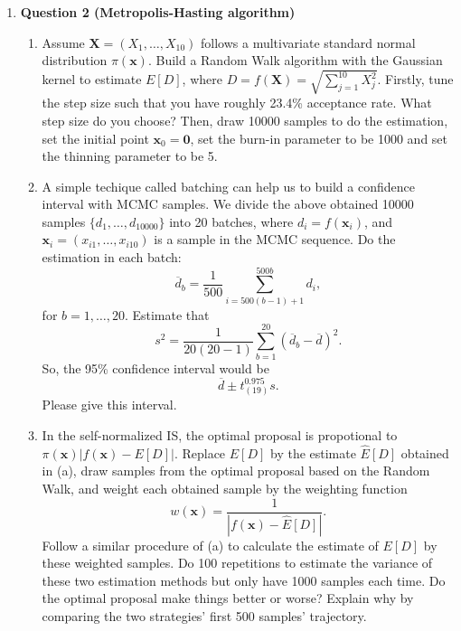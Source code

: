 \documentclass[notitlepage,a4paper,12pt]{article}%
\begin{document}
\begin{enumerate}

\item 
{\bf Question 2 (Metropolis-Hasting algorithm)}

\begin{enumerate} 
\item Assume $\mathbf{X}=(X_1,\dots,X_{10})$ follows a multivariate standard normal distribution $\pi(\mathbf{x})$. Build a Random Walk algorithm with the Gaussian kernel to estimate $E[D]$, where $D=f(\mathbf{X})=\sqrt{\sum_{j=1}^{10}X_j^2}$. Firstly, tune the step size such that you have roughly 23.4\% acceptance rate. What step size do you choose? Then, draw 10000 samples to do the estimation, set the initial point $\mathbf{x}_0=\mathbf{0}$, set the burn-in parameter to be 1000 and set the thinning parameter to be 5. 

\item A simple techique called batching can help us to build a confidence interval with MCMC samples. We divide the above obtained 10000 samples $\{d_1,\dots,d_{10000}\}$ into 20 batches, where $d_i=f(\mathbf{x}_i)$, and $\textbf{x}_i=(x_{i1},\dots,x_{i10})$ is a sample in the MCMC sequence. Do the estimation in each batch:
$$
\overline{d}_b=\frac{1}{500}\sum_{i=500(b-1)+1}^{500b}d_i,
$$
for $b=1,\dots,20$. Estimate that
$$
s^2=\frac{1}{20(20-1)}\sum_{b=1}^{20}(\overline{d}_b-\overline{d})^2. 
$$
So, the 95\% confidence interval would be
$$
\overline{d}\pm t_{(19)}^{0.975}s. 
$$
Please give this interval. 

\item In the self-normalized IS, the optimal proposal is propotional to $\pi(\mathbf{x})|f(\mathbf{x})-E[D]|$. Replace $E[D]$ by the estimate $\hat{E}[D]$ obtained in (a), draw samples from the optimal proposal based on the Random Walk, and weight each obtained sample by the weighting function 
$$
w(\mathbf{x})=\frac{1}{|f(\mathbf{x})-\hat{E}[D]|}. 
$$
Follow a similar procedure of (a) to calculate the estimate of $E[D]$ by these weighted samples. Do 100 repetitions to estimate the variance of these two estimation methods but only have 1000 samples each time. Do the optimal proposal make things better or worse? Explain why by comparing the two strategies' first 500 samples' trajectory. 

\end{enumerate}

\end{enumerate}
\end{document}

